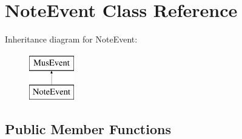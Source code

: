 \hypertarget{classNoteEvent}{}\section{Note\+Event Class Reference}
\label{classNoteEvent}
Inheritance diagram for Note\+Event\+:\begin{figure}[H]
\begin{center}
\leavevmode
\includegraphics[height=2.000000cm]{classNoteEvent}
\end{center}
\end{figure}
\subsection*{Public Member Functions}
